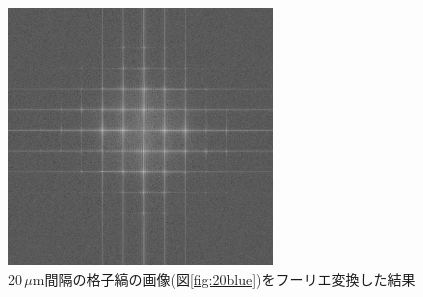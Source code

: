 \documentclass[titlepage]{jsarticle}
\begin{document}
\begin{figure}[htbp]
    \centering
    \includegraphics[width=7cm]{FFT_of_20um_blue2_tri.png}
    \caption{20\,$\mu$m間隔の格子縞の画像(図\ref{fig:20blue})をフーリエ変換した結果}
    \label{fig:fourier_direct}
\end{figure}
\end{document}
